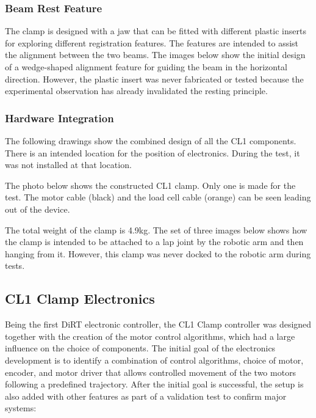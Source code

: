 \subsubsection{Beam Rest Feature}
\label{subsubsection:exploration-1-beam-rest-feature}

The clamp is designed with a jaw that can be fitted with different plastic inserts for exploring different registration features. The features are intended to assist the alignment between the two beams. The images below show the initial design of a wedge-shaped alignment feature for guiding the beam in the horizontal direction. However, the plastic insert was never fabricated or tested because the experimental observation  has already invalidated the resting principle.

\subsubsection{Hardware Integration}
\label{subsubsection:exploration-1-hardware-integration}

The following drawings show the combined design of all the CL1 components. There is an intended location for the position of electronics. During the test, it was not installed at that location.


The photo below shows the constructed CL1 clamp. Only one is made for the test. The motor cable (black) and the load cell cable (orange) can be seen leading out of the device.

The total weight of the clamp is 4.9kg.
The set of three images below shows how the clamp is intended to be attached to a lap joint by the robotic arm and then hanging from it. However, this clamp was never docked to the robotic arm during tests.


\subsection{CL1 Clamp Electronics}
\label{subsection:exploration-1-cl1-clamp-electronics}

Being the first DiRT electronic controller, the CL1 Clamp controller was designed together with the creation of the motor control algorithms, which had a large influence on the choice of components. The initial goal of the electronics development is to identify a combination of control algorithms, choice of motor, encoder, and motor driver that allows controlled movement of the two motors following a predefined trajectory.
After the initial goal is successful, the setup is also added with other features as part of a validation test to confirm major systems:

